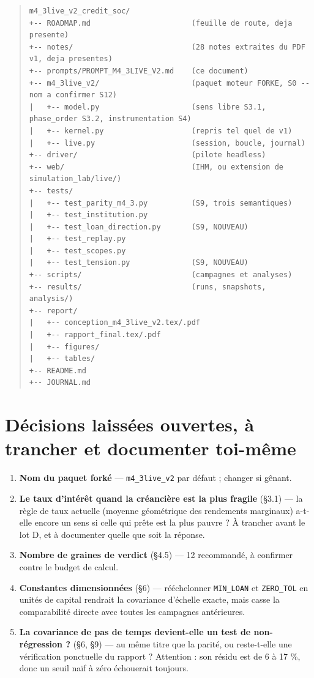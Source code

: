 \documentclass[11pt,a4paper]{article}
\newcommand{\code}[1]{\texttt{#1}}
\begin{document}
\begin{quote}\footnotesize
\begin{verbatim}
m4_3live_v2_credit_soc/
+-- ROADMAP.md                       (feuille de route, deja presente)
+-- notes/                           (28 notes extraites du PDF v1, deja presentes)
+-- prompts/PROMPT_M4_3LIVE_V2.md    (ce document)
+-- m4_3live_v2/                     (paquet moteur FORKE, S0 -- nom a confirmer S12)
|   +-- model.py                     (sens libre S3.1, phase_order S3.2, instrumentation S4)
|   +-- kernel.py                    (repris tel quel de v1)
|   +-- live.py                      (session, boucle, journal)
+-- driver/                          (pilote headless)
+-- web/                             (IHM, ou extension de simulation_lab/live/)
+-- tests/
|   +-- test_parity_m4_3.py          (S9, trois semantiques)
|   +-- test_institution.py
|   +-- test_loan_direction.py       (S9, NOUVEAU)
|   +-- test_replay.py
|   +-- test_scopes.py
|   +-- test_tension.py              (S9, NOUVEAU)
+-- scripts/                         (campagnes et analyses)
+-- results/                         (runs, snapshots, analysis/)
+-- report/
|   +-- conception_m4_3live_v2.tex/.pdf
|   +-- rapport_final.tex/.pdf
|   +-- figures/
|   +-- tables/
+-- README.md
+-- JOURNAL.md
\end{verbatim}
\end{quote}

\bigskip

\setcounter{section}{11}
\section{Décisions laissées ouvertes, à trancher et documenter toi-même}

\begin{enumerate}
\item \textbf{Nom du paquet forké} --- \code{m4\_3live\_v2} par défaut ; changer si gênant.
\item \textbf{Le taux d'intérêt quand la créancière est la plus fragile} (§3.1) --- la règle de taux actuelle (moyenne géométrique des rendements marginaux) a-t-elle encore un sens si celle qui prête est la plus pauvre ? À trancher avant le lot D, et à documenter quelle que soit la réponse.
\item \textbf{Nombre de graines de verdict} (§4.5) --- 12 recommandé, à confirmer contre le budget de calcul.
\item \textbf{Constantes dimensionnées} (§6) --- rééchelonner \code{MIN\_LOAN} et \code{ZERO\_TOL} en unités de capital rendrait la covariance d'échelle exacte, mais casse la comparabilité directe avec toutes les campagnes antérieures.
\item \textbf{La covariance de pas de temps devient-elle un test de non-régression ?} (§6, §9) --- au même titre que la parité, ou reste-t-elle une vérification ponctuelle du rapport ? Attention : son résidu est de 6 à 17 \%, donc un seuil naïf à zéro échouerait toujours.
\end{enumerate}
\end{document}
